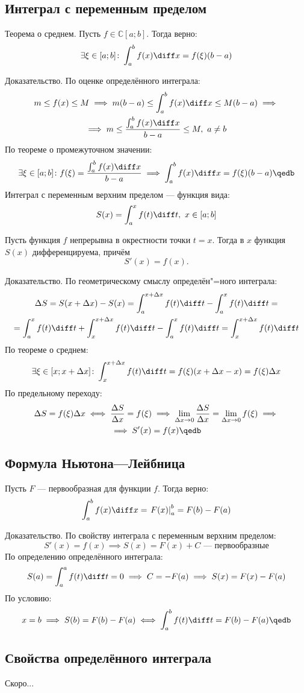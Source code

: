 \subsection{Интеграл с переменным пределом}

\begin{theorem}
{\bold Теорема о среднем.} Пусть $f\in\mathbb{C}[a;b]$. Тогда верно:
$$\exists\xi\in[a;b]\colon\int_a^bf(x)\diff x=f(\xi)(b-a)$$
\end{theorem}
{\bold Доказательство.} По оценке определённого интеграла:
\begin{gather*}
m\leq f(x)\leq M\implies m(b-a)\leq\int_a^bf(x)\diff x\leq M(b-a)\implies\\
\implies m\leq\frac{\int_a^bf(x)\diff x}{b-a}\leq M,\ a\neq b
\end{gather*}
По теореме о промежуточном значении:
$$\exists\xi\in[a;b]\colon f(\xi)=\frac{\int_a^bf(x)\diff x}{b-a}\implies\int_a^bf(x)\diff x=f(\xi)(b-a)\qedb$$
{\bold Интеграл с переменным верхним пределом} --- функция вида:
$$S(x)=\int_a^xf(t)\diff t,\ x\in[a;b]$$
\begin{theorem}
Пусть функция $f$ непрерывна в окрестности точки $t=x$. Тогда в $x$ функция $S(x)$ дифференцируема, причём
$$S'(x)=f(x).$$
\end{theorem}
{\bold Доказательство.} По геометрическому смыслу определён"=ного интеграла:
\begin{gather*}
\Delta S=S(x+\Delta x)-S(x)=\int_a^{x+\Delta x}f(t)\diff t-\int_a^xf(t)\diff t=\\
=\int_a^xf(t)\diff t+\int_x^{x+\Delta x}f(t)\diff t-\int_a^xf(t)\diff t=\int_x^{x+\Delta x}f(t)\diff t
\end{gather*}
По теореме о среднем:
$$\exists\xi\in[x;x+\Delta x]\colon\int_x^{x+\Delta x}f(t)\diff t=f(\xi)(x+\Delta x-x)=f(\xi)\Delta x$$
По предельному переходу:
\begin{gather*}
\Delta S=f(\xi)\Delta x\iff\frac{\Delta S}{\Delta x}=f(\xi)\implies\lim_{\Delta x\to 0}\frac{\Delta S}{\Delta x}=\lim_{\Delta x\to 0}f(\xi)\implies\\
\implies S'(x)=f(x)\qedb
\end{gather*}

\subsection{Формула Ньютона—Лейбница}

\begin{theorem}
Пусть $F$ --- первообразная для функции $f$. Тогда верно:
$$\int_a^bf(x)\diff x=\left.F(x)\right\rvert_a^b=F(b)-F(a)$$
\end{theorem}
{\bold Доказательство.} По свойству интеграла с переменным верхним пределом:
$$S'(x)=f(x)\implies S(x)=F(x)+C\text{ --- первообразные}$$
По определению определённого интеграла:
$$S(a)=\int_a^af(t)\diff t=0\implies C=-F(a)\implies S(x)=F(x)-F(a)$$
По условию:
$$x=b\implies S(b)=F(b)-F(a)\iff\int_a^bf(t)\diff t=F(b)-F(a)\qedb$$

\subsection{Свойства определённого интеграла}

Скоро...
